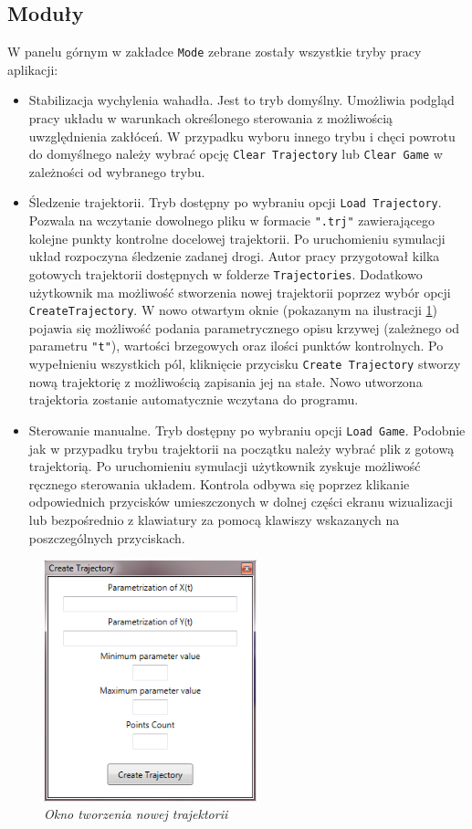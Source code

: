 \documentclass[12pt, oneside]{report}
\theoremstyle{definition}
\begin{document}
\subsection{Moduły}
W panelu górnym w zakładce \texttt{Mode} zebrane zostały wszystkie tryby pracy aplikacji:
\begin{itemize}
\item Stabilizacja wychylenia wahadła. Jest to tryb domyślny. Umożliwia podgląd pracy układu w warunkach określonego sterowania z możliwością uwzględnienia zakłóceń. W przypadku wyboru innego trybu i chęci powrotu do domyślnego należy wybrać opcję \texttt{Clear Trajectory} lub \texttt{Clear Game} w zależności od wybranego trybu.
\item Śledzenie trajektorii. Tryb dostępny po wybraniu opcji \texttt{Load Trajectory}. Pozwala na wczytanie dowolnego pliku w formacie \texttt{".trj"} zawierającego kolejne punkty kontrolne docelowej trajektorii. Po uruchomieniu symulacji układ rozpoczyna śledzenie zadanej drogi. Autor pracy przygotował kilka gotowych trajektorii dostępnych w folderze \texttt{Trajectories}. Dodatkowo użytkownik ma możliwość stworzenia nowej trajektorii poprzez wybór opcji \texttt{CreateTrajectory}. W nowo otwartym oknie (pokazanym na ilustracji \ref{CreateTrajectory}) pojawia się możliwość podania parametrycznego opisu krzywej (zależnego od parametru \texttt{"t"}), wartości brzegowych oraz ilości punktów kontrolnych. Po wypełnieniu wszystkich pól, kliknięcie przycisku \texttt{Create Trajectory} stworzy nową trajektorię z możliwością zapisania jej na stałe. Nowo utworzona trajektoria zostanie automatycznie wczytana do programu.
\item Sterowanie manualne. Tryb dostępny po wybraniu opcji \texttt{Load Game}. Podobnie jak w przypadku trybu trajektorii na początku należy wybrać plik z gotową trajektorią. Po uruchomieniu symulacji użytkownik zyskuje możliwość ręcznego sterowania układem. Kontrola odbywa się poprzez klikanie odpowiednich przycisków umieszczonych w dolnej części ekranu wizualizacji lub bezpośrednio z klawiatury za pomocą klawiszy wskazanych na poszczególnych przyciskach.
\end{itemize}

\begin{figure}[H]
	\centering
		\includegraphics[width = 175pt]{CreateTrajectory} 
		\caption{\textit{Okno tworzenia nowej trajektorii}}
		\label{CreateTrajectory}
\end{figure}
\end{document}
